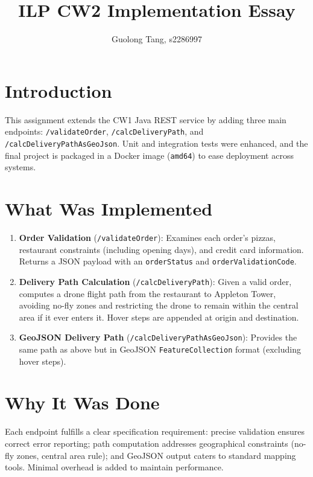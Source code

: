 \documentclass[12pt]{article}
\begin{document}
\title{ILP CW2 Implementation Essay}
\author{Guolong Tang, s2286997}
\date{}
\maketitle

\section{Introduction}
This assignment extends the CW1 Java REST service by adding three main endpoints: 
\texttt{/validateOrder}, \texttt{/calcDeliveryPath}, and \texttt{/calcDeliveryPathAsGeoJson}. 
Unit and integration tests were enhanced, and the final project is packaged in a Docker image 
(\texttt{amd64}) to ease deployment across systems.

\section{What Was Implemented}
\begin{enumerate}
    \item \textbf{Order Validation} (\texttt{/validateOrder}): Examines each order’s pizzas, 
    restaurant constraints (including opening days), and credit card information. Returns a 
    JSON payload with an \texttt{orderStatus} and \texttt{orderValidationCode}.
    
    \item \textbf{Delivery Path Calculation} (\texttt{/calcDeliveryPath}): Given a valid order, 
    computes a drone flight path from the restaurant to Appleton Tower, avoiding no-fly zones 
    and restricting the drone to remain within the central area if it ever enters it. Hover 
    steps are appended at origin and destination.

    \item \textbf{GeoJSON Delivery Path} (\texttt{/calcDeliveryPathAsGeoJson}): Provides the 
    same path as above but in GeoJSON \texttt{FeatureCollection} format (excluding hover 
    steps).
\end{enumerate}

\section{Why It Was Done}
Each endpoint fulfills a clear specification requirement: precise validation ensures correct 
error reporting; path computation addresses geographical constraints (no-fly zones, central 
area rule); and GeoJSON output caters to standard mapping tools. Minimal overhead is added 
to maintain performance.
\end{document}
